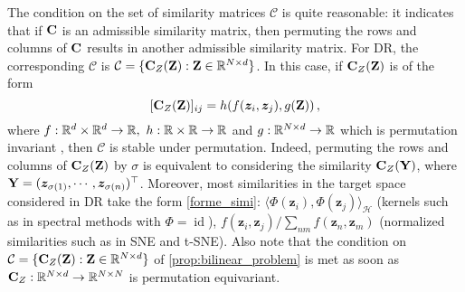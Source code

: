 \begin{remark}
	The condition on the set of similarity matrices $\mathcal{C}$ is quite reasonable: it indicates that if ${\mathbf{C}}$ is an admissible similarity matrix, then permuting the rows and columns of ${\mathbf{C}}$ results in another admissible similarity matrix. For DR, the corresponding $\mathcal{C}$ is $\mathcal{C} = \{{\mathbf{C}}_{Z}({\mathbf{Z}}): {\mathbf{Z}} \in \mathbb{R}^{N \times d}\}$. In this case, if ${\mathbf{C}}_{Z}({\mathbf{Z}})$ is of the form
	\begin{equation}
		\label{forme_simi}
		[{\mathbf{C}}_{Z}({\mathbf{Z}})]_{ij} = h(f(\bm{z}_i, \bm{z}_j), g({\mathbf{Z}}))\,,
	\end{equation} 
	where $f: \mathbb{R}^d \times \mathbb{R}^d \to \mathbb{R}, \ h: \mathbb{R} \times \mathbb{R} \to \mathbb{R}$ and $g: \mathbb{R}^{N \times d} \to \mathbb{R}$ which is permutation invariant \citep{bronstein2021geometric}, then $\mathcal{C}$ is stable under permutation. Indeed, permuting the rows and columns of ${\mathbf{C}}_{Z}({\mathbf{Z}})$ by $\sigma$ is equivalent to considering the similarity ${\mathbf{C}}_{Z}({\mathbf{Y}})$, where ${\mathbf{Y}} = (\bm{z}_{\sigma(1)}, \cdots, \bm{z}_{\sigma(n)})^\top$. Moreover, most similarities in the target space considered in DR take the form \cref{forme_simi}: $\langle \Phi(\bm{z}_i), \Phi(\bm{z}_j) \rangle_{\mathcal{H}}$ (kernels such as in spectral methods with $\Phi = \operatorname{id}$), $f(\bm{z}_i, \bm{z}_j)/ \sum_{nm} f(\bm{z}_n, \bm{z}_m)$ (normalized similarities such as in SNE and t-SNE). Also note that the condition on $\mathcal{C} = \{{\mathbf{C}}_{Z}({\mathbf{Z}}): {\mathbf{Z}} \in \mathbb{R}^{N \times d}\}$ of \cref{prop:bilinear_problem} is met as soon as ${\mathbf{C}}_{Z} : \mathbb{R}^{N \times d} \to \mathbb{R}^{N \times N}$ is permutation equivariant. 
\end{remark}

